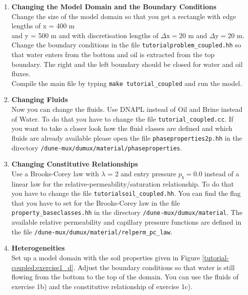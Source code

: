 \begin{enumerate}
\item \textbf{Changing the Model Domain and the Boundary Conditions} \\
Change the size of the model domain so that you get a rectangle
with edge lengths of x = 400 m \\  and y = 500 m and with discretisation lengths of  $\Delta \text{x} = 20$ m and $\Delta \text{y} = 20$ m. \\
Change the boundary conditions in the file \texttt{tutorialproblem\_coupled.hh} so that water enters from the bottom and oil is extracted from the top boundary. The right and the left boundary should be closed for water and oil fluxes.  \\
Compile the main file by typing \texttt{make tutorial\_coupled} and run the model.


\item \textbf{Changing Fluids} \\
Now you can change the fluids. Use DNAPL instead of Oil and Brine instead of Water. To do that you have to change the file \texttt{tutorial\_coupled.cc}. If you want to take a closer look how the fluid classes are defined and which fluids are already available please open the file \texttt{phaseproperties2p.hh} in the directory
\texttt{/dune-mux/dumux/material/phaseproperties}.

\item \textbf{Changing Constitutive Relationships} \\
Use a Brooks-Corey law with $\lambda$ = 2 and entry pressure $p_b = 0.0$ instead of a linear law for the relative-permeability/saturation relationship. To do that you have to change the file \texttt{tutorialsoil\_coupled.hh}. You can find the flag that you have to set for the Brooks-Corey law in the file \texttt{property\_baseclasses.hh} in the directory \texttt{/dune-mux/dumux/material}.  
The available relative permeability and capillary pressure functions are defined in the file \texttt{/dune-mux/dumux/material/relperm\_pc\_law}.
 
\item \textbf{Heterogeneities}  \\
Set up a model domain with the soil properties given in Figure \ref{tutorial-coupled:exercise1_d}. Adjust the boundary conditions so that water is still flowing from the bottom to the top of the domain. You can use the fluids of exercise 1b) and the constitutive relationship of exercise 1c). 


\end{enumerate}
